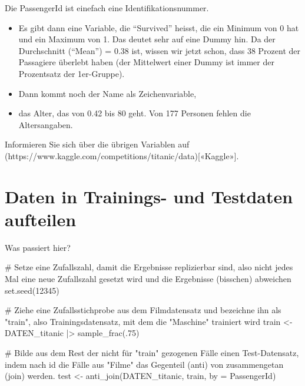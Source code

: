\documentclass[
  10pt,
  letterpaper,
  a4paper, twoside]{scrreprt}
\newenvironment{Shaded}{\begin{snugshade}}{\end{snugshade}}
\newcommand{\AttributeTok}[1]{\textcolor[rgb]{0.40,0.45,0.13}{#1}}
\newcommand{\CommentTok}[1]{\textcolor[rgb]{0.37,0.37,0.37}{#1}}
\newcommand{\DecValTok}[1]{\textcolor[rgb]{0.68,0.00,0.00}{#1}}
\newcommand{\FunctionTok}[1]{\textcolor[rgb]{0.28,0.35,0.67}{#1}}
\newcommand{\NormalTok}[1]{\textcolor[rgb]{0.00,0.23,0.31}{#1}}
\newcommand{\OtherTok}[1]{\textcolor[rgb]{0.00,0.23,0.31}{#1}}
\newcommand{\SpecialCharTok}[1]{\textcolor[rgb]{0.37,0.37,0.37}{#1}}
\newcommand{\StringTok}[1]{\textcolor[rgb]{0.13,0.47,0.30}{#1}}
\providecommand{\tightlist}{%
  \setlength{\itemsep}{0pt}\setlength{\parskip}{0pt}}\usepackage{longtable,booktabs,array}
\begin{document}
Die PassengerId ist einefach eine Identifikationsnummer.

\begin{itemize}
\tightlist
\item
  Es gibt dann eine Variable, die \enquote{Survived} heisst, die ein
  Minimum von 0 hat und ein Maximum von 1. Das deutet sehr auf eine
  Dummy hin. Da der Durchschnitt (\enquote{Mean}) = 0.38 ist, wissen wir
  jetzt schon, dass 38 Prozent der Passagiere überlebt haben (der
  Mittelwert einer Dummy ist immer der Prozentsatz der 1er-Gruppe).
\item
  Dann kommt noch der Name als Zeichenvariable,
\item
  das Alter, das von 0.42 bis 80 geht. Von 177 Personen fehlen die
  Altersangaben.
\end{itemize}

Informieren Sie sich über die übrigen Variablen auf
(https://www.kaggle.com/competitions/titanic/data){[}«Kaggle»{]}.

\section*{Daten in Trainings- und Testdaten
aufteilen}\label{daten-in-trainings--und-testdaten-aufteilen-1}


Was passiert hier?

\begin{Shaded}
\begin{Highlighting}[]
\CommentTok{\# Setze eine Zufallszahl, damit die Ergebnisse replizierbar sind, also nicht jedes Mal eine neue Zufallszahl gesetzt wird und die Ergebnisse (bisschen) abweichen}
\FunctionTok{set.seed}\NormalTok{(}\DecValTok{12345}\NormalTok{)}

\CommentTok{\# Ziehe eine Zufallsstichprobe aus dem Filmdatensatz und bezeichne ihn als "train", also Trainingsdatensatz, mit dem die "Maschine" trainiert wird}
\NormalTok{train }\OtherTok{\textless{}{-}}\NormalTok{ DATEN\_titanic }\SpecialCharTok{|\textgreater{}} 
  \FunctionTok{sample\_frac}\NormalTok{(.}\DecValTok{75}\NormalTok{)}

\CommentTok{\# Bilde aus dem Rest der nicht für "train" gezogenen Fälle einen Test{-}Datensatz, indem nach \textquotesingle{}id\textquotesingle{} die Fälle aus "Filme" das Gegenteil (anti) von zusammengetan (join) werden.}
\NormalTok{test  }\OtherTok{\textless{}{-}} \FunctionTok{anti\_join}\NormalTok{(DATEN\_titanic, train, }\AttributeTok{by =} \StringTok{\textquotesingle{}PassengerId\textquotesingle{}}\NormalTok{)}
\end{Highlighting}
\end{Shaded}
\end{document}
